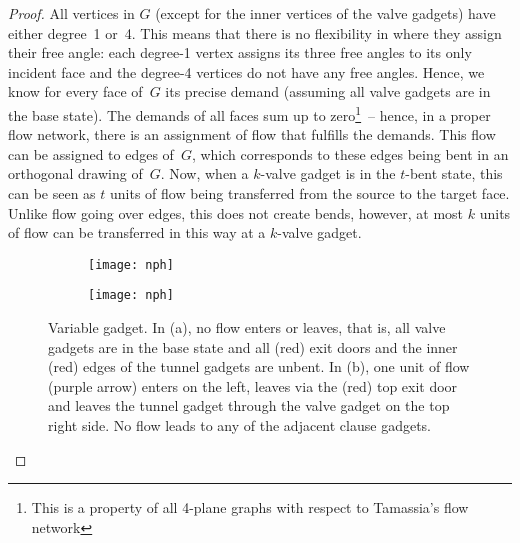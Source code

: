 \documentclass[runningheads]{llncs}
\begin{document}
\begin{proof}
    All vertices in $G$
    (except for the inner vertices of the valve gadgets)
    have either degree~1 or~4.
    This means that there is no flexibility in where
    they assign their free angle:
    each degree-1 vertex assigns its three free angles to its only incident face
    and the degree-4 vertices do not have any free angles.
    Hence, we know for every face of~$G$ its precise demand
    (assuming all valve gadgets are in the base state).
    The demands of all faces sum up to zero\footnote{%
        This is a property of all 4-plane graphs
        with respect to Tamassia's flow network}~--
    hence, in a proper flow network, there is
    an assignment of flow that fulfills the demands.
    This flow can be assigned to edges of~$G$,
    which corresponds to these edges being bent in an orthogonal drawing of~$G$.
    Now, when a $k$-valve gadget is in the $t$-bent state,
    this can be seen as $t$ units of flow
    being transferred from the source to the target face.
    Unlike flow going over edges, this does not
    create bends, however, at most $k$ units
    of flow can be transferred in this way
    at a $k$-valve gadget.
    
    \begin{figure}[t]
        \centering
        \begin{subfigure}[t]{.468 \textwidth}
            \centering
            \texttt{[image: nph]}
            \caption{}
            \label{fig:nph-variable-base}
        \end{subfigure}
        \hfill
        \begin{subfigure}[t]{.522 \textwidth}
            \centering
            \texttt{[image: nph]}
            \caption{}
            \label{fig:nph-variable-flowed}
        \end{subfigure}
        \caption{Variable gadget. In (a), no flow enters or leaves,
            that is, all valve gadgets are in the base state
            and all (red) exit doors and the inner (red) edges
            of the tunnel gadgets are unbent.
            In (b), one unit of flow (purple arrow)
            enters on the left, leaves via the (red) top exit door
            and leaves the tunnel gadget
            through the valve gadget on the top right side.
            No flow leads to any of the adjacent clause gadgets.}
        \label{fig:nph-variable}
    \end{figure}
    

\end{proof}
\end{document}
